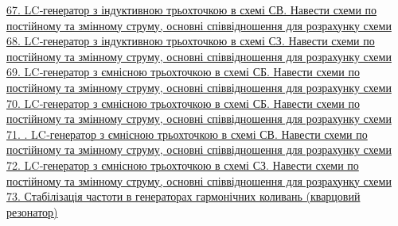 \documentclass[a4paper,14pt]{extreport}
\begin{document}
\hyperlink{33v}{67. LC‐генератор  з  індуктивною  трьохточкою  в  схемі  СВ.  Навести  схеми  по  постійному  та  змінному 
струму, основні співвідношення для розрахунку схеми}\\
\hyperlink{34v}{68. LC‐генератор  з  індуктивною  трьохточкою  в  схемі  СЗ.  Навести  схеми  по  постійному  та  змінному 
струму, основні співвідношення для розрахунку схеми}\\
\hyperlink{35v}{69. LC‐генератор  з  ємнісною  трьохточкою  в  схемі  СБ.  Навести  схеми  по  постійному  та  змінному 
струму, основні співвідношення для розрахунку схеми }\\
\hyperlink{36v}{70. LC‐генератор  з  ємнісною  трьохточкою  в  схемі  СБ.  Навести  схеми  по  постійному  та  змінному 
струму, основні співвідношення для розрахунку схеми }\\
\hyperlink{37v}{71. . LC‐генератор  з  ємнісною  трьохточкою  в  схемі  СВ.  Навести  схеми  по  постійному  та  змінному 
струму, основні співвідношення для розрахунку схеми }\\
\hyperlink{38v}{72. LC‐генератор з ємнісною трьохточкою в схемі СЗ. Навести схеми по постійному та змінному струму,
основні співвідношення для розрахунку схеми}\\
\hyperlink{39v}{73. Стабілізація частоти в генераторах гармонічних коливань (кварцовий резонатор)}\\



\newpage 
\end{document}
